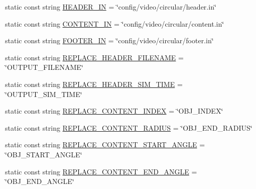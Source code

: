 \begin{DoxyCompactItemize}
\item 
static const string \hyperlink{classmultiscale_1_1video_1_1PolarGnuplotScriptGenerator_acd5fb0e27c9f7857d68b7ec9cb62fb74}{H\-E\-A\-D\-E\-R\-\_\-\-I\-N} = \char`\"{}config/video/circular/header.\-in\char`\"{}
\item 
static const string \hyperlink{classmultiscale_1_1video_1_1PolarGnuplotScriptGenerator_ad8fb67fe439899d85924bd7339b7d08c}{C\-O\-N\-T\-E\-N\-T\-\_\-\-I\-N} = \char`\"{}config/video/circular/content.\-in\char`\"{}
\item 
static const string \hyperlink{classmultiscale_1_1video_1_1PolarGnuplotScriptGenerator_aae225d7380fd7815efa1aed69087e6b0}{F\-O\-O\-T\-E\-R\-\_\-\-I\-N} = \char`\"{}config/video/circular/footer.\-in\char`\"{}
\item 
static const string \hyperlink{classmultiscale_1_1video_1_1PolarGnuplotScriptGenerator_af5f0a7c41016915eaa5756695f17fd4a}{R\-E\-P\-L\-A\-C\-E\-\_\-\-H\-E\-A\-D\-E\-R\-\_\-\-F\-I\-L\-E\-N\-A\-M\-E} = \char`\"{}O\-U\-T\-P\-U\-T\-\_\-\-F\-I\-L\-E\-N\-A\-M\-E\char`\"{}
\item 
static const string \hyperlink{classmultiscale_1_1video_1_1PolarGnuplotScriptGenerator_ab06a56e8ac6c117d9a3d1279bd114941}{R\-E\-P\-L\-A\-C\-E\-\_\-\-H\-E\-A\-D\-E\-R\-\_\-\-S\-I\-M\-\_\-\-T\-I\-M\-E} = \char`\"{}O\-U\-T\-P\-U\-T\-\_\-\-S\-I\-M\-\_\-\-T\-I\-M\-E\char`\"{}
\item 
static const string \hyperlink{classmultiscale_1_1video_1_1PolarGnuplotScriptGenerator_a0899b28bb340224529c005d262ffb09f}{R\-E\-P\-L\-A\-C\-E\-\_\-\-C\-O\-N\-T\-E\-N\-T\-\_\-\-I\-N\-D\-E\-X} = \char`\"{}O\-B\-J\-\_\-\-I\-N\-D\-E\-X\char`\"{}
\item 
static const string \hyperlink{classmultiscale_1_1video_1_1PolarGnuplotScriptGenerator_a2fcfd2afdf3aa1f35b18fc04946f40d2}{R\-E\-P\-L\-A\-C\-E\-\_\-\-C\-O\-N\-T\-E\-N\-T\-\_\-\-R\-A\-D\-I\-U\-S} = \char`\"{}O\-B\-J\-\_\-\-E\-N\-D\-\_\-\-R\-A\-D\-I\-U\-S\char`\"{}
\item 
static const string \hyperlink{classmultiscale_1_1video_1_1PolarGnuplotScriptGenerator_acb8550fbb7a7f199d01d77622b054e10}{R\-E\-P\-L\-A\-C\-E\-\_\-\-C\-O\-N\-T\-E\-N\-T\-\_\-\-S\-T\-A\-R\-T\-\_\-\-A\-N\-G\-L\-E} = \char`\"{}O\-B\-J\-\_\-\-S\-T\-A\-R\-T\-\_\-\-A\-N\-G\-L\-E\char`\"{}
\item 
static const string \hyperlink{classmultiscale_1_1video_1_1PolarGnuplotScriptGenerator_aeb30ca67d1a36b859159849f64f1804d}{R\-E\-P\-L\-A\-C\-E\-\_\-\-C\-O\-N\-T\-E\-N\-T\-\_\-\-E\-N\-D\-\_\-\-A\-N\-G\-L\-E} = \char`\"{}O\-B\-J\-\_\-\-E\-N\-D\-\_\-\-A\-N\-G\-L\-E\char`\"{}

\end{DoxyCompactItemize}

